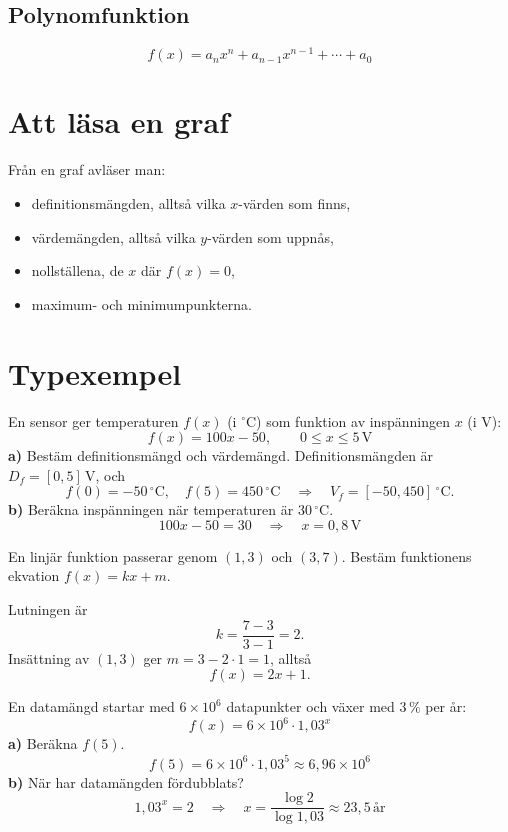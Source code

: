 \subsection{Polynomfunktion}
\label{c8:sec:polynom}
\[
  f(x) = a_n x^n + a_{n-1} x^{n-1} + \cdots + a_0
\]

\section{Att läsa en graf}
\label{c8:sec:graf}
Från en graf avläser man:
\begin{itemize}
  \item definitionsmängden, alltså vilka $x$-värden som finns,
  \item värdemängden, alltså vilka $y$-värden som uppnås,
  \item nollställena, de $x$ där $f(x) = 0$,
  \item maximum- och minimumpunkterna.
\end{itemize}

\section{Typexempel}
\label{c8:sec:typexempel}

\begin{exempel}[Temperatursensor]
En sensor ger temperaturen $f(x)$ (i $^{\circ}$C) som funktion av inspänningen $x$ (i V):
\[
  f(x) = 100x - 50, \qquad 0 \leq x \leq 5\,\text{V}
\]
\textbf{a)} Bestäm definitionsmängd och värdemängd. Definitionsmängden är
$D_f = [0, 5]\,\text{V}$, och
\[
  f(0) = -50\,^{\circ}\text{C}, \quad f(5) = 450\,^{\circ}\text{C}
  \quad \Rightarrow \quad V_f = [-50, 450]\,^{\circ}\text{C}.
\]
\textbf{b)} Beräkna inspänningen när temperaturen är $30\,^{\circ}\text{C}$.
\[
  100x - 50 = 30 \quad \Rightarrow \quad x = 0{,}8\,\text{V}
\]
\end{exempel}

\begin{exempel}
En linjär funktion passerar genom $(1, 3)$ och $(3, 7)$. Bestäm funktionens ekvation
$f(x) = kx + m$.

Lutningen är
\[
  k = \frac{7 - 3}{3 - 1} = 2.
\]
Insättning av $(1, 3)$ ger $m = 3 - 2 \cdot 1 = 1$, alltså
\[
  f(x) = 2x + 1.
\]
\end{exempel}

\begin{exempel}
En datamängd startar med $6 \times 10^6$ datapunkter och växer med $3\,\%$ per år:
\[
  f(x) = 6 \times 10^6 \cdot 1{,}03^x
\]
\textbf{a)} Beräkna $f(5)$.
\[
  f(5) = 6 \times 10^6 \cdot 1{,}03^5 \approx 6{,}96 \times 10^6
\]
\textbf{b)} När har datamängden fördubblats?
\[
  1{,}03^x = 2 \quad \Rightarrow \quad x = \frac{\log 2}{\log 1{,}03} \approx 23{,}5\,\text{år}
\]
\end{exempel}
